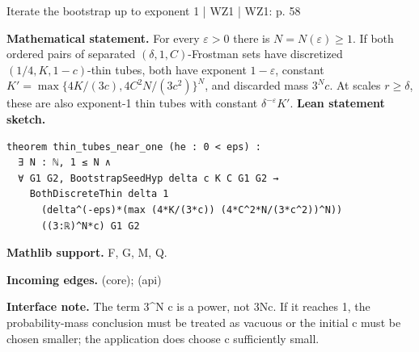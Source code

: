 \documentclass[10pt,a4paper]{article}
\newcommand{\nodecard}[1]{\hyperlink{node-#1}{\texttt{\detokenize{#1}}}}
\begin{document}
\begin{minipage}{\linewidth}
\hypertarget{node-C8_7}{}
\begin{tcolorbox}[colback=white,colframe=radialfg,colbacktitle=radialbg,coltitle=ink,boxrule=0.45pt,arc=1.6mm,left=3mm,right=3mm,top=2mm,bottom=2mm,title={\sffamily\bfseries WZ1 Corollary 8.7 \hfill \texttt{C8\_7}}]
{\sffamily\small\color{muted}Iterate the bootstrap up to exponent 1 | WZ1 | WZ1: p. 58}\par
\textbf{Mathematical statement.} For every $\varepsilon>0$ there is $N=N(\varepsilon)\ge1$.
If both ordered pairs of separated $(\delta,1,C)$-Frostman sets have discretized $(1/4,K,1-c)$-thin tubes, both have exponent $1-\varepsilon$, constant
$K'=\max\{4K/(3c),4C^2N/(3c^2)\}^{N}$, and discarded mass $3^Nc$.
At scales $r\ge\delta$, these are also exponent-1 thin tubes with constant $\delta^{-\varepsilon}K'$.
\smallskip\textbf{Lean statement sketch.}
\begin{Verbatim}[fontsize=\small,breaklines=true,breakanywhere=true,tabsize=2]
theorem thin_tubes_near_one (he : 0 < eps) :
  ∃ N : ℕ, 1 ≤ N ∧
  ∀ G1 G2, BootstrapSeedHyp delta c K C G1 G2 →
    BothDiscreteThin delta 1
      (delta^(-eps)*(max (4*K/(3*c)) (4*C^2*N/(3*c^2))^N))
      ((3:ℝ)^N*c) G1 G2
\end{Verbatim}
{\footnotesize\textbf{Mathlib support.} F, G, M, Q.\par
\textbf{Incoming edges.} \nodecard{P8_6p} (core); \nodecard{Iparams} (api)\par}
{\footnotesize\textbf{Interface note.} The term 3\textasciicircum{}N c is a power, not 3Nc. If it reaches 1, the probability-mass conclusion must be treated as vacuous or the initial c must be chosen smaller; the application does choose c sufficiently small.}
\end{tcolorbox}\end{minipage}\par\medskip
\end{document}
